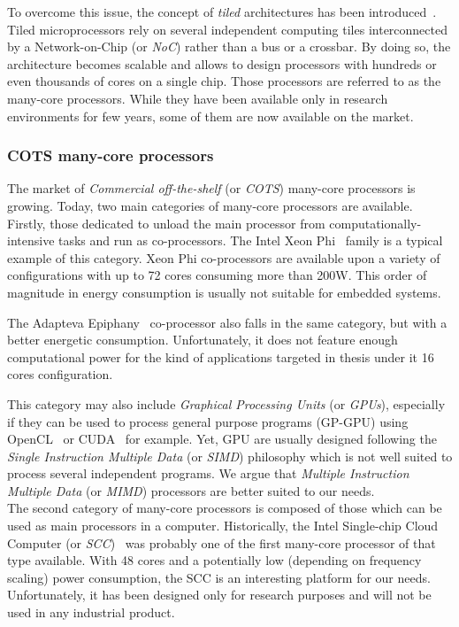 \documentclass[main.tex]{subfiles}
\begin{document}
To overcome this issue, the concept of \emph{tiled} architectures has been introduced~\cite{Taylor2007}. Tiled microprocessors rely on several independent computing tiles interconnected by a Network-on-Chip (or \emph{NoC}) rather than a bus or a crossbar. By doing so, the architecture becomes scalable and allows to design processors with hundreds or even thousands of cores on a single chip. Those processors are referred to as the many-core processors. While they have been available only in research environments for few years, some of them are now available on the market.



\subsubsection{COTS many-core processors}
The market of \emph{Commercial off-the-shelf} (or \emph{COTS}) many-core processors is growing. Today, two main categories of many-core processors are available. Firstly, those dedicated to unload the main processor from computationally-intensive tasks and run as co-processors. The Intel Xeon Phi~\cite{XeonPhi} family is a typical example of this category. Xeon Phi co-processors are available upon a variety of configurations with up to 72 cores consuming more than 200W. This order of magnitude in energy consumption is usually not suitable for embedded systems. 

The Adapteva Epiphany~\cite{Epiphany} co-processor also falls in the same category, but with a better energetic consumption. Unfortunately, it does not feature enough computational power for the kind of applications targeted in thesis under it 16 cores configuration. 

This category may also include \emph{Graphical Processing Units} (or \emph{GPUs}), especially if they can be used to process general purpose programs (GP-GPU) using OpenCL~\cite{OpenCL} or CUDA~\cite{CUDA} for example. Yet, GPU are usually designed following the \emph{Single Instruction Multiple Data} (or \emph{SIMD}) philosophy which is not well suited to process several independent programs. We argue that \emph{Multiple Instruction Multiple Data} (or \emph{MIMD}) processors are better suited to our needs. \\


The second category of many-core processors is composed of those which can be used as main processors in a computer. Historically, the Intel Single-chip Cloud Computer (or \emph{SCC})~\cite{intel_scc} was probably one of the first many-core processor of that type available. With 48 cores and a potentially low (depending on frequency scaling) power consumption, the SCC is an interesting platform for our needs. Unfortunately, it has been designed only for research purposes and will not be used in any industrial product.
\end{document}
